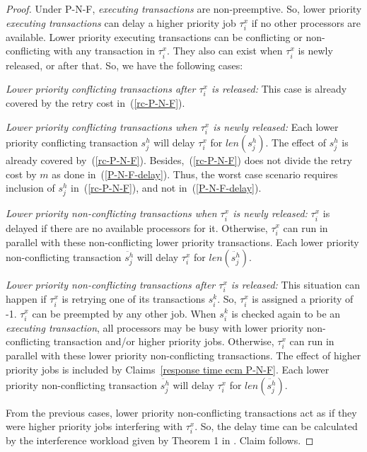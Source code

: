 \begin{proof}
Under P-N-F, \emph{executing transactions} are non-preemptive. So, lower priority \emph{executing transactions} can delay a higher priority job $\tau_i^x$ if no other processors are available. Lower priority executing transactions can be conflicting or non-conflicting with any transaction in $\tau_{i}^{x}$. They also can exist when $\tau_i^x$ is newly released, or after that. So, we have the following cases:

\emph{Lower priority conflicting transactions after $\tau_i^x$ is released:} This case is already covered by the retry cost in~(\ref{rc-P-N-F}).

\emph{Lower priority conflicting transactions when $\tau_i^x$ is newly released:} Each lower priority conflicting transaction $s_j^h$ will delay $\tau_i^x$ for $len(s_j^h)$. The effect of $s_j^h$ is already covered by~(\ref{rc-P-N-F}). Besides,~(\ref{rc-P-N-F}) does not divide the retry cost by $m$ as done in~(\ref{P-N-F-delay}). Thus, the worst case scenario requires inclusion of $s_j^h$ in~(\ref{rc-P-N-F}), and not in~(\ref{P-N-F-delay}).

\emph{Lower priority non-conflicting transactions when $\tau_i^x$ is newly released:} $\tau_i^x$ is delayed if there are no available processors for it. Otherwise, $\tau_i^x$ can run in parallel with these non-conflicting lower priority transactions. Each lower priority non-conflicting transaction $\ddot{s_j^h}$ will delay $\tau_i^x$ for $len(\ddot{s_j^h})$.

\emph{Lower priority non-conflicting transactions after $\tau_i^x$ is released:} This situation can happen if $\tau_i^x$ is retrying one of its transactions $s_i^k$. So, $\tau_i^x$ is assigned a priority of -1. $\tau_i^x$ can be preempted by any other job. When $s_i^k$ is checked again to be an \emph{executing transaction}, all processors may be busy with lower priority non-conflicting transaction and/or higher priority jobs. Otherwise, $\tau_i^x$ can run in parallel with these lower priority non-conflicting transactions. The effect of higher priority jobs is included by Claims~\ref{response time ecm P-N-F}.
Each lower priority non-conflicting transaction $\ddot{s_j^h}$ will delay $\tau_i^x$ for $len(\ddot{s_j^h})$.

From the previous cases, lower priority non-conflicting transactions act as if they were higher priority jobs interfering with $\tau_{i}^{x}$. So, the delay time can be calculated by the interference workload given by Theorem 1 in \cite{key-2}. Claim follows.
\end{proof}


